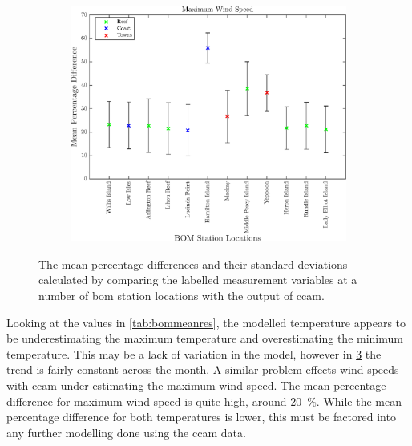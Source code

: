 \begin{figure}[!hbt]
\begin{subfigure}[b]{0.45\textwidth}
	    \caption{}
	    \label{subfig:maxtladyelliot}
    \end{subfigure}
    \\
    \vspace{0.5cm}
    \begin{subfigure}[b]{0.45\textwidth}
        \includegraphics[width=\textwidth]{Fig/Research/BomComparison/MaxWind_PercentageDiffMean.eps}
	    \caption{}
	    \label{subfig:maxtlihoureef}
    \end{subfigure}
    \caption{The mean percentage differences and their standard deviations calculated by comparing the labelled measurement variables at a number of \gls{bom} station locations with the output of \gls{ccam}.}
    \label{fig:bomcompdata}
\end{figure}

	Looking at the values in \cref{tab:bommeanres}, the modelled temperature appears to be underestimating the maximum temperature and overestimating the minimum temperature. This may be a lack of variation in the model, however in \cref{fig:bomcompdata} the trend is fairly constant across the month. A similar problem effects wind speeds with \gls{ccam} under estimating the maximum wind speed. The mean percentage difference for maximum wind speed is quite high, around \SI{20}{\percent}. While the mean percentage difference for both temperatures is lower, this must be factored into any further modelling done using the \gls{ccam} data.









